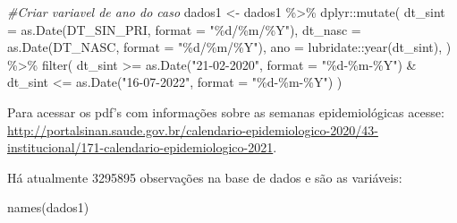 \documentclass[
]{article}
\newenvironment{Shaded}{\begin{snugshade}}{\end{snugshade}}
\newcommand{\AttributeTok}[1]{\textcolor[rgb]{0.77,0.63,0.00}{#1}}
\newcommand{\CommentTok}[1]{\textcolor[rgb]{0.56,0.35,0.01}{\textit{#1}}}
\newcommand{\FunctionTok}[1]{\textcolor[rgb]{0.00,0.00,0.00}{#1}}
\newcommand{\NormalTok}[1]{#1}
\newcommand{\OtherTok}[1]{\textcolor[rgb]{0.56,0.35,0.01}{#1}}
\newcommand{\SpecialCharTok}[1]{\textcolor[rgb]{0.00,0.00,0.00}{#1}}
\newcommand{\StringTok}[1]{\textcolor[rgb]{0.31,0.60,0.02}{#1}}
\begin{document}
\begin{Shaded}
\begin{Highlighting}[]
\CommentTok{\#Criar variavel de ano do caso}
\NormalTok{dados1 }\OtherTok{\textless{}{-}}\NormalTok{  dados1 }\SpecialCharTok{\%\textgreater{}\%}
\NormalTok{  dplyr}\SpecialCharTok{::}\FunctionTok{mutate}\NormalTok{(}
    \AttributeTok{dt\_sint =} \FunctionTok{as.Date}\NormalTok{(DT\_SIN\_PRI, }\AttributeTok{format =} \StringTok{"\%d/\%m/\%Y"}\NormalTok{),}
    \AttributeTok{dt\_nasc =} \FunctionTok{as.Date}\NormalTok{(DT\_NASC, }\AttributeTok{format =} \StringTok{"\%d/\%m/\%Y"}\NormalTok{),}
    \AttributeTok{ano =}\NormalTok{ lubridate}\SpecialCharTok{::}\FunctionTok{year}\NormalTok{(dt\_sint),}
\NormalTok{  ) }\SpecialCharTok{\%\textgreater{}\%}
  \FunctionTok{filter}\NormalTok{(}
\NormalTok{    dt\_sint }\SpecialCharTok{\textgreater{}=} \FunctionTok{as.Date}\NormalTok{(}\StringTok{"21{-}02{-}2020"}\NormalTok{, }\AttributeTok{format =} \StringTok{"\%d{-}\%m{-}\%Y"}\NormalTok{) }\SpecialCharTok{\&}
\NormalTok{      dt\_sint }\SpecialCharTok{\textless{}=} \FunctionTok{as.Date}\NormalTok{(}\StringTok{"16{-}07{-}2022"}\NormalTok{, }\AttributeTok{format =} \StringTok{"\%d{-}\%m{-}\%Y"}\NormalTok{)}
\NormalTok{  ) }
\end{Highlighting}
\end{Shaded}

Para acessar os pdf's com informações sobre as semanas epidemiológicas
acesse:
\url{http://portalsinan.saude.gov.br/calendario-epidemiologico-2020/43-institucional/171-calendario-epidemiologico-2021}.

Há atualmente 3295895 observações na base de dados e são as variáveis:

\begin{Shaded}
\begin{Highlighting}[]
\FunctionTok{names}\NormalTok{(dados1)}
\end{Highlighting}
\end{Shaded}
\end{document}
